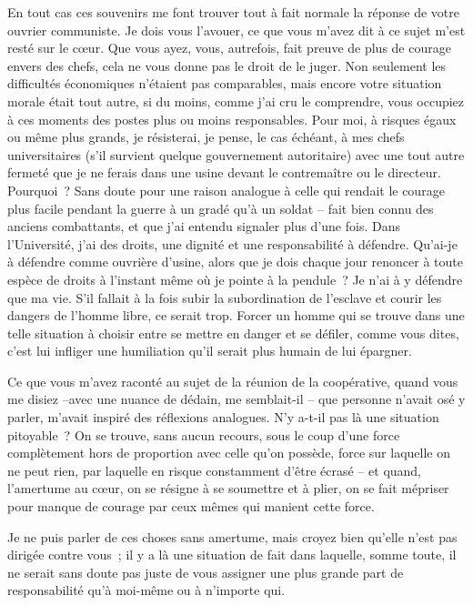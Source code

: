 \documentclass[french,twoside]{book} %
\begin{document}
En tout cas ces souvenirs me font trouver tout à fait normale la réponse de votre ouvrier communiste. Je dois vous l'avouer, ce que vous m'avez dit à ce sujet m'est resté sur le cœur. Que vous ayez, vous, autrefois, fait preuve de plus de courage envers des chefs, cela ne vous donne pas le droit de le juger. Non seulement les difficultés économiques n'étaient pas comparables, mais encore votre situation morale était tout autre, si du moins, comme j'ai cru le comprendre, vous occupiez à ces moments des postes plus ou moins responsables. Pour moi, à risques égaux ou même plus grands, je résisterai, je pense, le cas échéant, à mes chefs universitaires (s'il survient quelque gouvernement autoritaire) avec une tout autre fermeté que je ne ferais dans une usine devant le contremaître ou le directeur. Pourquoi ? Sans doute pour une raison analogue à celle qui rendait le courage plus facile pendant la guerre à un gradé qu'à un soldat – fait bien connu des anciens combattants, et que j'ai entendu signaler plus d'une fois. Dans l'Université, j'ai des droits, une dignité et une responsabilité à défendre. Qu'ai-je à défendre comme ouvrière d'usine, alors que je dois chaque jour renoncer à toute espèce de droits à l'instant même où je pointe à la pendule ? Je n'ai à y défendre que ma vie. S'il fallait à la fois subir la subordination de l'esclave et courir les dangers de l'homme libre, ce serait trop. Forcer un homme qui se trouve dans une telle situation à choisir entre se mettre en danger et se défiler, comme vous dites, c'est lui infliger une humiliation qu'il serait plus humain de lui épargner.\par
Ce que vous m'avez raconté au sujet de la réunion de la coopérative, quand vous me disiez –avec une nuance de dédain, me semblait-il – que personne n'avait osé y parler, m'avait inspiré des réflexions analogues. N'y a-t-il pas là une situation pitoyable ? On se trouve, sans aucun recours, sous le coup d'une force complètement hors de proportion avec celle qu'on possède, force sur laquelle on ne peut rien, par laquelle en risque constamment d'être écrasé – et quand, l'amertume au cœur, on se résigne à se soumettre et à plier, on se fait mépriser pour manque de courage par ceux mêmes qui manient cette force.\par
Je ne puis parler de ces choses sans amertume, mais croyez bien qu'elle n'est pas dirigée contre vous ; il y a là une situation de fait dans laquelle, somme toute, il ne serait sans doute pas juste de vous assigner une plus grande part de responsabilité qu'à moi-même ou à n'importe qui.\par
\end{document}
